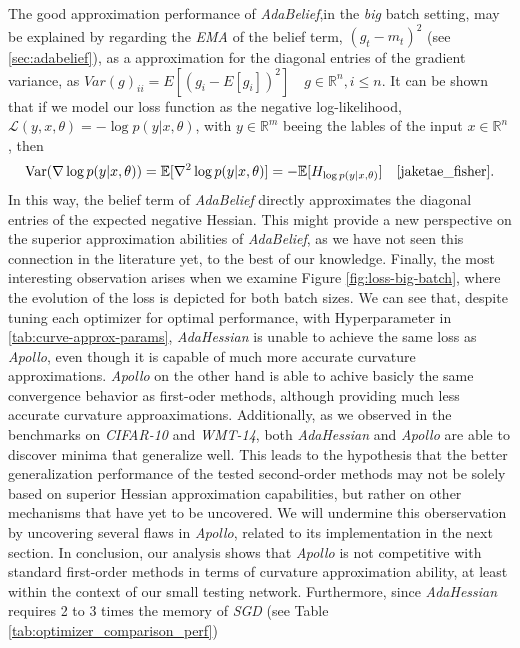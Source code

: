 The good approximation performance of \emph{AdaBelief},in the \emph{big} batch setting,  may be explained by regarding the \emph{EMA} of the belief term, $(g_t - m_t)^2$ (see \ref{sec:adabelief}), 
as a approximation for the diagonal entries of the gradient variance, as $Var(g)_{ii} = E[(g_i - E[g_i])^2] \quad g \in \mathbb{R}^n, i \leq n$.
It can be shown that if we model our loss function as the negative log-likelihood, $\mathcal{L}(y,x,\theta) = - \log p(y|x,\theta)$, with $y \in \mathbb{R}^m$ beeing the lables of the input $x\in \mathbb{R}^n$, then
\begin{equation}
    \text{Var}(\nabla \log p(y|x,\theta)) = \mathbb{E}[\nabla^2 \log p(y|x,\theta)] = - \mathbb{E}[H_{\log p(y|x,\theta)}] \quad \text{\cite{jaketae_fisher}}.
\end{equation}
In this way, the belief term of \emph{AdaBelief} directly approximates the diagonal entries of the expected negative Hessian.
This might provide a new perspective on the superior approximation abilities of \emph{AdaBelief},
as we have not seen this connection in the literature yet, to the best of our knowledge.
Finally, the most interesting observation arises when we examine Figure \ref{fig:loss-big-batch},
where the evolution of the loss is depicted for both batch sizes.
We can see that, despite tuning each optimizer for optimal performance, with Hyperparameter in \ref{tab:curve-approx-params}, \emph{AdaHessian} is unable to achieve the same loss as \emph{Apollo},
even though it is capable of much more accurate curvature approximations. \emph{Apollo} on the other hand is 
able to achive basicly the same convergence behavior as first-oder methods, although providing much less accurate curvature
approaximations.
Additionally, as we observed in the benchmarks on \emph{CIFAR-10} and \emph{WMT-14}, both \emph{AdaHessian} and \emph{Apollo} are able to discover minima that generalize well.
This leads to the hypothesis that the better generalization performance of the tested second-order
methods may not be solely based on superior Hessian approximation capabilities,
but rather on other mechanisms that have yet to be uncovered.
We will undermine this oberservation by uncovering several flaws in \emph{Apollo}, related to its implementation in the next section.
In conclusion, our analysis shows that \emph{Apollo} is not competitive with standard first-order methods in terms of curvature approximation ability,
at least within the context of our small testing network.
Furthermore, since \emph{AdaHessian} requires 2 to 3 times the memory of \emph{SGD} (see Table \ref{tab:optimizer_comparison_perf})

